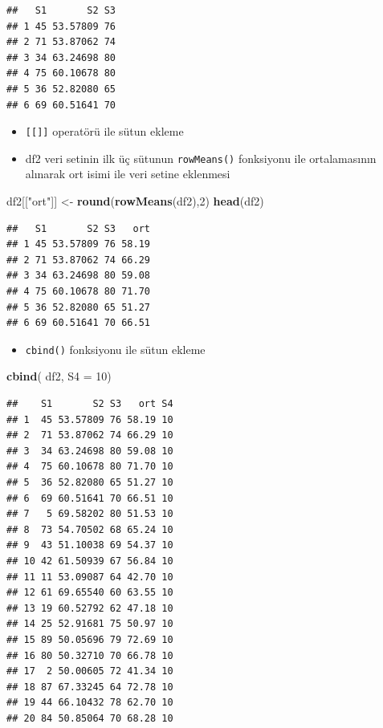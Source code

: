 \documentclass[
  oneside]{book}
\newenvironment{Shaded}{\begin{snugshade}}{\end{snugshade}}
\newcommand{\AttributeTok}[1]{\textcolor[rgb]{0.13,0.29,0.53}{#1}}
\newcommand{\DecValTok}[1]{\textcolor[rgb]{0.00,0.00,0.81}{#1}}
\newcommand{\FunctionTok}[1]{\textcolor[rgb]{0.13,0.29,0.53}{\textbf{#1}}}
\newcommand{\NormalTok}[1]{#1}
\newcommand{\OtherTok}[1]{\textcolor[rgb]{0.56,0.35,0.01}{#1}}
\newcommand{\StringTok}[1]{\textcolor[rgb]{0.31,0.60,0.02}{#1}}
\providecommand{\tightlist}{%
  \setlength{\itemsep}{0pt}\setlength{\parskip}{0pt}}
\begin{document}
\begin{verbatim}
##   S1       S2 S3
## 1 45 53.57809 76
## 2 71 53.87062 74
## 3 34 63.24698 80
## 4 75 60.10678 80
## 5 36 52.82080 65
## 6 69 60.51641 70
\end{verbatim}

\begin{itemize}
\item
  \texttt{{[}{[}{]}{]}} operatörü ile sütun ekleme
\item
  df2 veri setinin ilk üç sütunun \texttt{rowMeans()} fonksiyonu ile ortalamasının alınarak ort isimi ile veri setine eklenmesi
\end{itemize}

\begin{Shaded}
\begin{Highlighting}[]
\NormalTok{df2[[}\StringTok{"ort"}\NormalTok{]] }\OtherTok{\textless{}{-}} \FunctionTok{round}\NormalTok{(}\FunctionTok{rowMeans}\NormalTok{(df2),}\DecValTok{2}\NormalTok{)}
\FunctionTok{head}\NormalTok{(df2)}
\end{Highlighting}
\end{Shaded}

\begin{verbatim}
##   S1       S2 S3   ort
## 1 45 53.57809 76 58.19
## 2 71 53.87062 74 66.29
## 3 34 63.24698 80 59.08
## 4 75 60.10678 80 71.70
## 5 36 52.82080 65 51.27
## 6 69 60.51641 70 66.51
\end{verbatim}

\begin{itemize}
\tightlist
\item
  \texttt{cbind()} fonksiyonu ile sütun ekleme
\end{itemize}

\begin{Shaded}
\begin{Highlighting}[]
\FunctionTok{cbind}\NormalTok{( df2, }\AttributeTok{S4 =} \DecValTok{10}\NormalTok{)}
\end{Highlighting}
\end{Shaded}

\begin{verbatim}
##    S1       S2 S3   ort S4
## 1  45 53.57809 76 58.19 10
## 2  71 53.87062 74 66.29 10
## 3  34 63.24698 80 59.08 10
## 4  75 60.10678 80 71.70 10
## 5  36 52.82080 65 51.27 10
## 6  69 60.51641 70 66.51 10
## 7   5 69.58202 80 51.53 10
## 8  73 54.70502 68 65.24 10
## 9  43 51.10038 69 54.37 10
## 10 42 61.50939 67 56.84 10
## 11 11 53.09087 64 42.70 10
## 12 61 69.65540 60 63.55 10
## 13 19 60.52792 62 47.18 10
## 14 25 52.91681 75 50.97 10
## 15 89 50.05696 79 72.69 10
## 16 80 50.32710 70 66.78 10
## 17  2 50.00605 72 41.34 10
## 18 87 67.33245 64 72.78 10
## 19 44 66.10432 78 62.70 10
## 20 84 50.85064 70 68.28 10
\end{verbatim}
\end{document}
